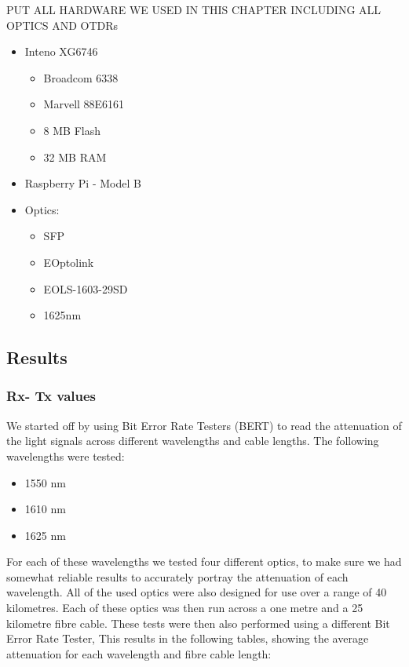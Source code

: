 \documentclass{article}
\begin{document}
PUT ALL HARDWARE WE USED IN THIS CHAPTER INCLUDING ALL OPTICS AND OTDRs
\begin{itemize}
\item Inteno XG6746 \cite{Inteno:XG6746}
\begin{itemize}
\item Broadcom 6338
\item Marvell 88E6161
\item 8 MB Flash
\item 32 MB RAM
\end{itemize}

\item Raspberry Pi - Model B

\item Optics:
\begin{itemize}
\item SFP
\item EOptolink
\item EOLS-1603-29SD
\item 1625nm
\end{itemize}
\end{itemize}

\subsection{Results}

\subsubsection{Rx- Tx values}
We started off by using Bit Error Rate Testers (BERT) to read the attenuation of the light signals across different wavelengths and cable lengths.
The following wavelengths were tested:
\begin{itemize}
	\item 1550 nm
	\item 1610 nm
	\item 1625 nm
\end{itemize}

For each of these wavelengths we tested four different optics, to make sure we had somewhat reliable results to accurately portray the attenuation of each wavelength.
All of the used optics were also designed for use over a range of 40 kilometres.
Each of these optics was then run across a one metre and a 25 kilometre fibre cable.
These tests were then also performed using a different Bit Error Rate Tester, 
This results in the following tables, showing the average attenuation for each wavelength and fibre cable length:
\end{document}
